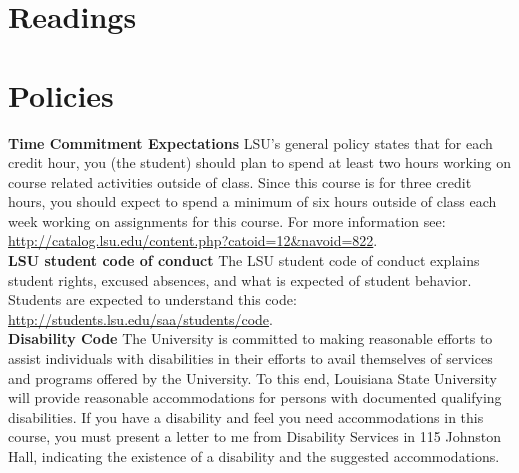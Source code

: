 \documentclass[11pt,article,oneside]{memoir}
\begin{document}
\clearpage


\section{Readings}
\renewcommand*{\bibfont}{\normalsize} %
\vspace*{0.5cm}
\nocite{*}
\setlength{}
\printbibliography[heading=none]

\clearpage

\section{Policies}

\noindent \textbf{Time Commitment Expectations}
LSU's general policy states that for each credit hour, you (the student) should plan to
spend at least two hours working on course related activities outside of class. Since this course is for three credit hours, you should expect to spend a minimum of six hours outside of class each week working on assignments for this course. For more information see: 
\url{http://catalog.lsu.edu/content.php?catoid=12&navoid=822}.\\

\noindent \textbf{LSU student code of conduct}
The LSU student code of conduct explains student rights, excused absences, and what is expected of student behavior. Students are expected to understand this code:  \url{http://students.lsu.edu/saa/students/code}.\\ %

\noindent \textbf{Disability Code}
The University is committed to making reasonable efforts to assist individuals with disabilities in
their efforts to avail themselves of services and programs offered by the University. To this end,
Louisiana State University will provide reasonable accommodations for persons with
documented qualifying disabilities. If you have a disability and feel you need accommodations in
this course, you must present a letter to me from Disability Services in 115 Johnston Hall,
indicating the existence of a disability and the suggested accommodations.\\
\end{document}
